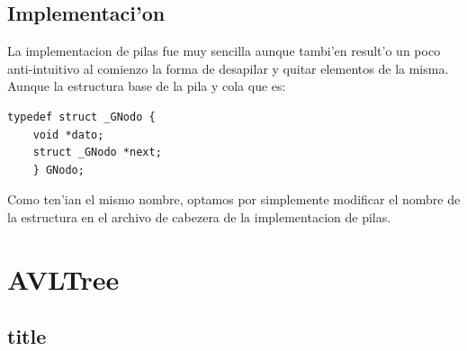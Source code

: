 \documentclass{article}
\begin{document}
		\subsection{Implementaci'on}
			La implementacion de pilas fue muy sencilla aunque tambi'en result'o un poco anti-intuitivo al comienzo la forma de desapilar y quitar elementos de la misma.
			Aunque la estructura base de la pila y cola que es:
			\begin{lstlisting}[style=CStyle]
	typedef struct _GNodo {
	void *dato;
	struct _GNodo *next;
	} GNodo;
			\end{lstlisting}
			
			Como ten'ian el mismo nombre, optamos por simplemente modificar el nombre de la estructura en el archivo de cabezera de la implementacion de pilas. 
			
	\section{AVLTree}
		\subsection{title}
		
			
\end{document}
